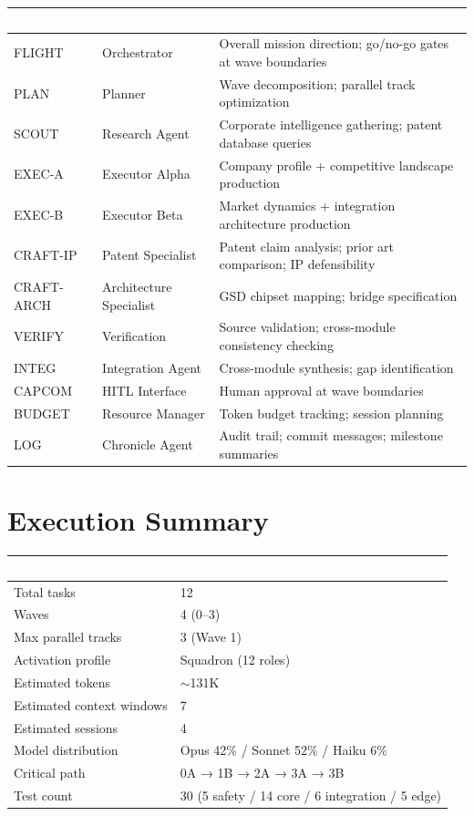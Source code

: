 \documentclass[11pt,letterpaper]{article}
\newcommand{\tableheader}[1]{\textbf{\sffamily\textcolor{white}{#1}}}
\begin{document}
\begin{center}
\begin{tabularx}{\textwidth}{L{2cm}L{2.5cm}X}
\toprule
{}
\tableheader{Role} & \tableheader{Agent} & \tableheader{Responsibility} \\
\midrule
FLIGHT & Orchestrator & Overall mission direction; go/no-go gates at wave boundaries \\
PLAN & Planner & Wave decomposition; parallel track optimization \\
SCOUT & Research Agent & Corporate intelligence gathering; patent database queries \\
EXEC-A & Executor Alpha & Company profile + competitive landscape production \\
EXEC-B & Executor Beta & Market dynamics + integration architecture production \\
CRAFT-IP & Patent Specialist & Patent claim analysis; prior art comparison; IP defensibility \\
CRAFT-ARCH & Architecture Specialist & GSD chipset mapping; bridge specification \\
VERIFY & Verification & Source validation; cross-module consistency checking \\
INTEG & Integration Agent & Cross-module synthesis; gap identification \\
CAPCOM & HITL Interface & Human approval at wave boundaries \\
BUDGET & Resource Manager & Token budget tracking; session planning \\
LOG & Chronicle Agent & Audit trail; commit messages; milestone summaries \\
\bottomrule
\end{tabularx}
\end{center}

\section{Execution Summary}

\begin{center}
\begin{tabularx}{\textwidth}{L{5cm}X}
\toprule
{}
\tableheader{Metric} & \tableheader{Value} \\
\midrule
Total tasks & 12 \\
Waves & 4 (0--3) \\
Max parallel tracks & 3 (Wave 1) \\
Activation profile & Squadron (12 roles) \\
Estimated tokens & $\sim$131K \\
Estimated context windows & 7 \\
Estimated sessions & 4 \\
Model distribution & Opus 42\% / Sonnet 52\% / Haiku 6\% \\
Critical path & 0A → 1B → 2A → 3A → 3B \\
Test count & 30 (5 safety / 14 core / 6 integration / 5 edge) \\
\bottomrule
\end{tabularx}
\end{center}
\end{document}
